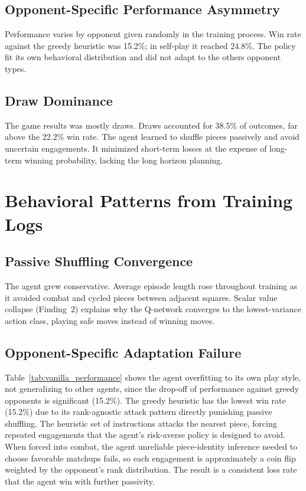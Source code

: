 \subsection{Opponent-Specific Performance Asymmetry}\label{finding:5}
Performance varies by opponent given randomly in the training process. Win rate against the greedy heuristic was 15.2\%; in self-play it reached 24.8\%. The policy fit its own behavioral distribution and did not adapt to the others opponent types.

\subsection{Draw Dominance}\label{finding:6}
The game results was mostly draws. Draws accounted for 38.5\% of outcomes, far above the 22.2\% win rate. The agent learned to shuffle pieces passively and avoid uncertain engagements. It minimized short-term losses at the expense of long-term winning probability, lacking the long horizon planning.




\section{Behavioral Patterns from Training Logs}

\subsection{Passive Shuffling Convergence}

The agent grew conservative. Average episode length rose throughout training as it avoided combat and cycled pieces between adjacent squares. Scalar value collapse (Finding~2) explains why the Q-network converges to the lowest-variance action class, playing safe moves instead of winning moves.

\subsection{Opponent-Specific Adaptation Failure}

Table~\ref{tab:vanilla_performance} shows the agent overfitting to its own play style, not generalizing to other agents, since the drop-off of performance against greedy opponents is significant (15.2\%). The greedy heuristic has the lowest win rate (15.2\%) due to its rank-agnostic attack pattern directly punishing passive shuffling. The heuristic set of instructions attacks the nearest piece, forcing repeated engagements that the agent's risk-averse policy is designed to avoid. When forced into combat, the agent unreliable piece-identity inference needed to choose favorable matchups fails, so each engagement is approximately a coin flip weighted by the opponent's rank distribution. The result is a consistent loss rate that the agent win with further passivity.

